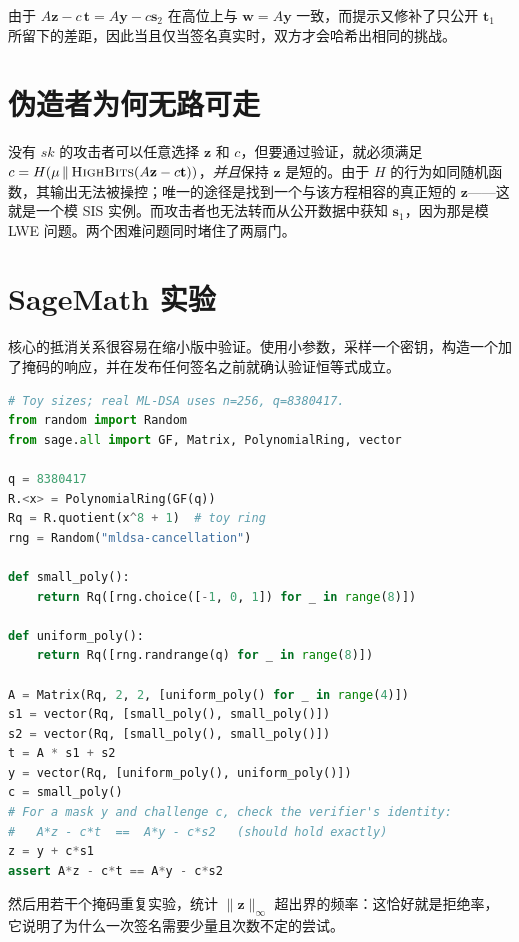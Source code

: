 由于 $A\mathbf{z} - c\,\mathbf{t} = A\mathbf{y} - c\mathbf{s}_2$ 在高位上与 $\mathbf{w}=A\mathbf{y}$ 一致，而提示又修补了只公开 $\mathbf{t}_1$ 所留下的差距，因此当且仅当签名真实时，双方才会哈希出相同的挑战。

\section{伪造者为何无路可走}

没有 $sk$ 的攻击者可以任意选择 $\mathbf{z}$ 和 $c$，但要通过验证，就必须满足 $c = H(\mu\,\|\,\textsc{HighBits}(A\mathbf{z}-c\mathbf{t}))$，\emph{并且}保持 $\mathbf{z}$ 是短的。由于 $H$ 的行为如同随机函数，其输出无法被操控；唯一的途径是找到一个与该方程相容的真正短的 $\mathbf{z}$——这就是一个模 SIS 实例。而攻击者也无法转而从公开数据中获知 $\mathbf{s}_1$，因为那是模 LWE 问题。两个困难问题同时堵住了两扇门。

\section{SageMath 实验}

核心的抵消关系很容易在缩小版中验证。使用小参数，采样一个密钥，构造一个加了掩码的响应，并在发布任何签名之前就确认验证恒等式成立。

\begin{lstlisting}[language=Python]
# Toy sizes; real ML-DSA uses n=256, q=8380417.
from random import Random
from sage.all import GF, Matrix, PolynomialRing, vector

q = 8380417
R.<x> = PolynomialRing(GF(q))
Rq = R.quotient(x^8 + 1)  # toy ring
rng = Random("mldsa-cancellation")

def small_poly():
    return Rq([rng.choice([-1, 0, 1]) for _ in range(8)])

def uniform_poly():
    return Rq([rng.randrange(q) for _ in range(8)])

A = Matrix(Rq, 2, 2, [uniform_poly() for _ in range(4)])
s1 = vector(Rq, [small_poly(), small_poly()])
s2 = vector(Rq, [small_poly(), small_poly()])
t = A * s1 + s2
y = vector(Rq, [uniform_poly(), uniform_poly()])
c = small_poly()
# For a mask y and challenge c, check the verifier's identity:
#   A*z - c*t  ==  A*y - c*s2   (should hold exactly)
z = y + c*s1
assert A*z - c*t == A*y - c*s2
\end{lstlisting}

然后用若干个掩码重复实验，统计 $\|\mathbf{z}\|_\infty$ 超出界的频率：这恰好就是拒绝率，它说明了为什么一次签名需要少量且次数不定的尝试。

